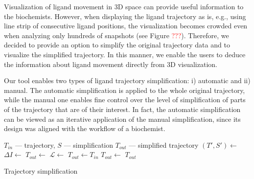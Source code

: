 Visualization of ligand movement in 3D space can provide useful information to the biochemists.
However, when displaying the ligand trajectory as is, e.g., using line strip of consecutive ligand positions, the visualization becomes crowded even when analyzing only hundreds of snapshots (see Figure \textcolor{red}{???}).
Therefore, we decided to provide an option to simplify the original trajectory data and to visualize the simplified trajectory.
In this manner, we enable the users to deduce the information about ligand movement directly from 3D visualization.

Our tool enables two types of ligand trajectory simplification: i) automatic and ii) manual.
The automatic simplification is applied to the whole original trajectory, while the manual one enables fine control over the level of simplification of parts of the trajectory that are of their interest.
In fact, the automatic simplification can be viewed as an iterative application of the manual simplification\textcolor[rgb]{1,0,0}{, since its design was aligned with the workflow of a biochemist.}

\begin{algorithm}
  \begin{algorithmic}[1]
	  \Require $T_{in}$ --- trajectory, $S$ --- simplification
	  \Ensure $T_{out}$ --- simplified trajectory
			\State $(T', S') \gets$  
			\State
			  \State $\Delta I \gets$ 
				\State $T_{out} \gets$ 
			\Else %
			  \State $\mathcal{L} \gets$  
				\State $T_{out} \gets T_{in}$
				 
					  \State $T_{out} \gets$ 
					\EndFor
				\EndFor
			\EndIf
			\State
			\State {}
			\State \Return $T_{out}$
		\EndProcedure
  \end{algorithmic}
	\caption{Trajectory simplification}
  \label{alg:simplify}
\end{algorithm}

